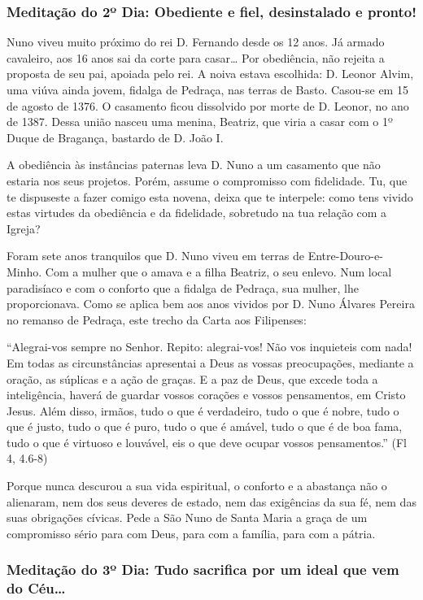 \documentclass[a4paper,14pt]{extarticle} \usepackage[utf8]{inputenc}
\begin{document}
\subsubsection{Meditação do 2º Dia: Obediente e fiel, desinstalado e pronto!}

Nuno viveu muito próximo do rei D. Fernando desde os 12 anos. Já armado cavaleiro, aos 16 anos sai da corte para casar… Por obediência, não rejeita a proposta de seu pai, apoiada pelo rei. A noiva estava escolhida: D. Leonor Alvim, uma viúva ainda jovem, fidalga de Pedraça, nas terras de Basto. Casou-se em 15 de agosto de 1376. O casamento ficou dissolvido por morte de D. Leonor, no ano de 1387. Dessa união nasceu uma menina, Beatriz, que viria a casar com o 1º Duque de Bragança, bastardo de D. João I.

A obediência às instâncias paternas leva D. Nuno a um casamento que não estaria nos seus projetos. Porém, assume o compromisso com fidelidade. Tu, que te dispuseste a fazer comigo esta novena, deixa que te interpele: como tens vivido estas virtudes da obediência e da fidelidade, sobretudo na tua relação com a Igreja?

Foram sete anos tranquilos que D. Nuno viveu em terras de Entre-Douro-e-Minho. Com a mulher que o amava e a filha Beatriz, o seu enlevo. Num local paradisíaco e com o conforto que a fidalga de Pedraça, sua mulher, lhe proporcionava. Como se aplica bem aos anos vividos por D. Nuno Álvares Pereira no remanso de Pedraça, este trecho da Carta aos Filipenses:

“Alegrai-vos sempre no Senhor. Repito: alegrai-vos! Não vos inquieteis com nada! Em todas as circunstâncias apresentai a Deus as vossas preocupações, mediante a oração, as súplicas e a ação de graças. E a paz de Deus, que excede toda a inteligência, haverá de guardar vossos corações e vossos pensamentos, em Cristo Jesus. Além disso, irmãos, tudo o que é verdadeiro, tudo o que é nobre, tudo o que é justo, tudo o que é puro, tudo o que é amável, tudo o que é de boa fama, tudo o que é virtuoso e louvável, eis o que deve ocupar vossos pensamentos.” (Fl 4, 4.6-8)

Porque nunca descurou a sua vida espiritual, o conforto e a abastança não o alienaram, nem dos seus deveres de estado, nem das exigências da sua fé, nem das suas obrigações cívicas. Pede a São Nuno de Santa Maria a graça de um compromisso sério para com Deus, para com a família, para com a pátria.


\subsubsection{Meditação do 3º Dia: Tudo sacrifica por um ideal que vem do Céu…}
\end{document}
